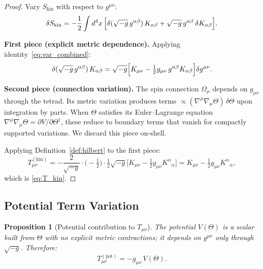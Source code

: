 \documentclass[12pt]{article}
\newtheorem{proposition}[definition]{Proposition}
\begin{document}
\begin{proof}
Vary $S_{\mathrm{kin}}$ with respect to $g^{\mu\nu}$:
\begin{equation}
  \delta S_{\mathrm{kin}}
  = -\frac{1}{2}\int d^4x\,\Bigl[
      \delta(\sqrt{-g}\,g^{\alpha\beta})\,K_{\alpha\beta}
    + \sqrt{-g}\,g^{\alpha\beta}\,\delta K_{\alpha\beta}
    \Bigr].
\end{equation}

\textbf{First piece (explicit metric dependence).}
Applying identity~\eqref{eq:var_combined}:
\begin{equation}
  \delta(\sqrt{-g}\,g^{\alpha\beta})\,K_{\alpha\beta}
  = \sqrt{-g}\Bigl[K_{\mu\nu} - \tfrac{1}{2}g_{\mu\nu}\,
    g^{\alpha\beta}K_{\alpha\beta}\Bigr]\delta g^{\mu\nu}.
\end{equation}

\textbf{Second piece (connection variation).}
The spin connection $\Omega_\mu$ depends on $g_{\mu\nu}$ through the tetrad.
Its metric variation produces terms $\propto (\nabla^\mu\nabla_\mu\Theta)\,\delta\Theta$
upon integration by parts.  When $\Theta$ satisfies its Euler--Lagrange equation
$\nabla^\mu\nabla_\mu\Theta = \partial V/\partial\Theta^\dagger$, these reduce to
boundary terms that vanish for compactly supported variations.
We discard this piece on-shell.

Applying Definition~\ref{def:hilbert} to the first piece:
\begin{equation}
  T^{(\mathrm{kin})}_{\mu\nu}
  = -\frac{2}{\sqrt{-g}}\cdot\bigl(-\tfrac{1}{2}\bigr)\cdot
    \tfrac{1}{2}\sqrt{-g}\bigl[K_{\mu\nu} - \tfrac{1}{2}g_{\mu\nu}K^\alpha{}_\alpha\bigr]
  = K_{\mu\nu} - \tfrac{1}{2}g_{\mu\nu}K^\alpha{}_\alpha,
\end{equation}
which is \eqref{eq:T_kin}.
\end{proof}

\subsection{Potential Term Variation}

\begin{proposition}[Potential contribution to $T_{\mu\nu}$]
\label{prop:T_pot}
The potential $V(\Theta)$ is a scalar built from $\Theta$ with no explicit
metric contractions; it depends on $g^{\mu\nu}$ only through $\sqrt{-g}$.
Therefore:
\begin{equation}
  \label{eq:T_pot}
  \boxed{T^{(\mathrm{pot})}_{\mu\nu} = -g_{\mu\nu}\,V(\Theta).}
\end{equation}
\end{proposition}
\end{document}
